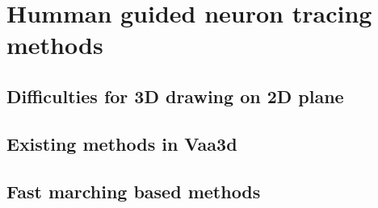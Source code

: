 \chapter{Humman guided neuron tracing methods} \label{chpt:manualnt}
\section{Difficulties for 3D drawing on 2D plane}
\section{Existing methods in Vaa3d}
\section{Fast marching based methods}
